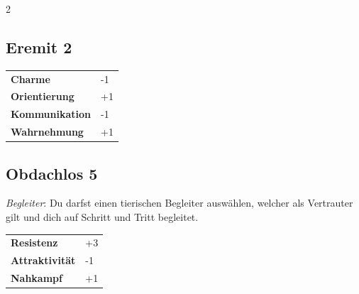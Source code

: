 \begin{multicols}{2}
\begin{tcolorbox}

\end{tcolorbox}

\begin{tcolorbox}
    \subsection*{Eremit \hfill \small{2 }}
    \tcblower




\begin{tabular}{@{}ll@{}}
    \textbf{Charme} & -1\\
    \textbf{Orientierung} & +1\\
    \textbf{Kommunikation} & -1\\
    \textbf{Wahrnehmung} & +1\\
\end{tabular}


\end{tcolorbox}

\begin{tcolorbox}
    \subsection*{Obdachlos \hfill \small{5 }}
    \tcblower
\textit{Begleiter}: Du darfst einen tierischen Begleiter auswählen, welcher als Vertrauter gilt und dich auf Schritt und Tritt begleitet.


\vspace{3mm}

\begin{tabular}{@{}ll@{}}
    \textbf{Resistenz} & +3\\
    \textbf{Attraktivität} & -1\\
    \textbf{Nahkampf} & +1\\
\end{tabular}


\end{tcolorbox}


\end{multicols}
